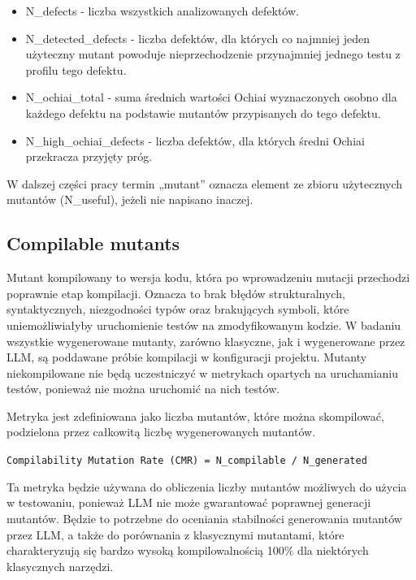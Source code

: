 \documentclass[12pt,a4paper,oldfontcommands]{memoir}
\theoremstyle{plain}
\theoremstyle{definition}
\theoremstyle{remark}
\begin{document}
    \begin{itemize}
        \item N\_defects - liczba wszystkich analizowanych defektów.
        \item N\_detected\_defects - liczba defektów, dla których co najmniej jeden użyteczny mutant powoduje nieprzechodzenie przynajmniej jednego testu z profilu tego defektu.
        \item N\_ochiai\_total - suma średnich wartości Ochiai wyznaczonych osobno dla każdego defektu na podstawie mutantów przypisanych do tego defektu.
        \item N\_high\_ochiai\_defects - liczba defektów, dla których średni Ochiai przekracza przyjęty próg.
    \end{itemize}

    W dalszej części pracy termin „mutant” oznacza element ze zbioru użytecznych mutantów (N\_useful), jeżeli nie napisano inaczej.

    \subsection{Compilable mutants}

    Mutant kompilowany to wersja kodu, która po wprowadzeniu mutacji przechodzi poprawnie etap kompilacji.
    Oznacza to brak błędów strukturalnych, syntaktycznych, niezgodności typów oraz brakujących symboli, które uniemożliwiałyby uruchomienie testów na zmodyfikowanym kodzie.
    W badaniu wszystkie wygenerowane mutanty, zarówno klasyczne, jak i wygenerowane przez LLM, są poddawane próbie kompilacji w konfiguracji projektu.
    Mutanty niekompilowane nie będą uczestniczyć w metrykach opartych na uruchamianiu testów, ponieważ nie można uruchomić na nich testów.

    Metryka jest zdefiniowana jako liczba mutantów, które można skompilować, podzielona przez całkowitą liczbę wygenerowanych mutantów.
    \begin{center}
        \texttt{Compilability Mutation Rate (CMR) = N\_compilable / N\_generated}
    \end{center}

    Ta metryka będzie używana do obliczenia liczby mutantów możliwych do użycia w testowaniu, ponieważ LLM nie może gwarantować poprawnej generacji mutantów.
    Będzie to potrzebne do oceniania stabilności generowania mutantów przez LLM, a także do porównania z klasycznymi mutantami, które charakteryzują się bardzo wysoką kompilowalnością 100\% dla niektórych klasycznych narzędzi.
\end{document}
